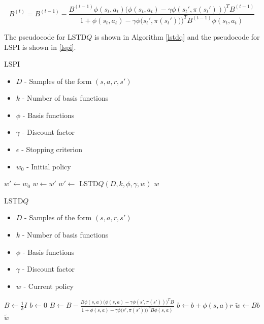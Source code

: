 \[
    B^{(t)} = B^{(t-1)} - \frac{B^{(t-1)}\phi(s_t,a_t)\big(\phi(s_t,a_t) - \gamma\phi(s_t',\pi(s_t'))\big)^TB^{(t-1)}}{1 + \phi(s_t,a_t) - \gamma\phi\big(s_t',\pi(s_t'))\big)^TB^{(t-1)}\phi(s_t,a_t)}
\]

The pseudocode for LSTD$Q$ is shown in Algorithm \ref{lstdq} and the pseudocode for LSPI is shown in \ref{lspi}. \cite{lspi}

\begin{algorithm}
\caption{LSPI}
\label{lspi}
    \begin{algorithmic}[1]
        \REQUIRE
            \begin{itemize} 
                \item $D$ - Samples of the form $(s,a,r,s')$ 
                \item $k$ - Number of basis functions
                \item $\phi$ - Basis functions
                \item $\gamma$ - Discount factor
                \item $\epsilon$ - Stopping criterion
                \item $w_0$ - Initial policy
            \end{itemize}
        \STATE $w' \leftarrow w_0$
        \REPEAT
            \STATE $w \leftarrow w'$
            \STATE $w' \leftarrow$ LSTD$Q (D, k, \phi, \gamma, w)$
        \RETURN $w$
    \end{algorithmic}
\end{algorithm}

\begin{algorithm}
\caption{LSTD$Q$}
\label{lstdq}
    \begin{algorithmic}[1]
        \REQUIRE
            \begin{itemize} 
                \item $D$ - Samples of the form $(s,a,r,s')$ 
                \item $k$ - Number of basis functions
                \item $\phi$ - Basis functions
                \item $\gamma$ - Discount factor
                \item $w$ - Current policy
            \end{itemize}
        \STATE $B \leftarrow \frac{1}{\delta}I$ 
        \STATE $b \leftarrow 0$ 
            \STATE $B \leftarrow B - \frac{B\phi(s,a)\big(\phi(s,a) - \gamma\phi(s',\pi(s'))\big)^TB}{1 + \phi(s,a) - \gamma\phi\big(s',\pi(s'))\big)^TB\phi(s,a)}$
            \STATE $b \leftarrow b + \phi(s,a)r$
        \ENDFOR
        \STATE $\tilde{w} \leftarrow Bb$
        \RETURN $\tilde{w}$
    \end{algorithmic}
\end{algorithm}

